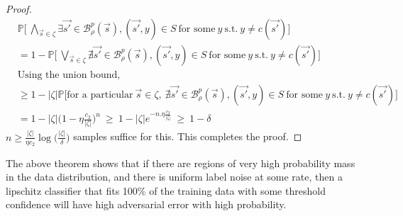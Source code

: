 \documentclass[12pt, oneside]{book}
\begin{document}
\begin{proof}
\begin{equation*}
    \label{eq:lipschitz-extension}
\begin{split}
    & \mathbb{P} \biggl [~\underset{\vec{s} \in \zeta}{\bigwedge} \exists 
    \vec{s'} \in \mathcal{B}_\rho^p(\vec{s}), 
    (\vec{s'}, y) \in S~\text{for some}~ y~\text{s.t.}~y \neq c(\vec{s'})
    \biggr] \\
    & = 1 - \mathbb{P} \biggl [~\underset{\vec{s} \in \zeta}{\bigvee} \nexists 
    \vec{s'} \in \mathcal{B}_\rho^p(\vec{s}), 
    (\vec{s'}, y) \in S~\text{for some}~ y~\text{s.t.}~y \neq c(\vec{s'})
    \biggr] \\
    & \text{Using the union bound,} \\
    & \geq 1 - |\zeta| \mathbb{P} \biggl [\text{for a particular}~\vec{s} \in \zeta,
    ~\nexists \vec{s'} \in \mathcal{B}_\rho^p(\vec{s}), 
    (\vec{s'}, y) \in S~\text{for some}~ y~\text{s.t.}~y \neq c(\vec{s'})
    \biggr] \\
    & = 1 - |\zeta| \biggl(1 - \eta \frac{c_2}{|\zeta|}\biggr)^{n}~
    \geq ~ 1 - |\zeta| e^{-n.\eta \frac{c_2}{|\zeta|}} ~ \geq ~ 1 - \delta
\end{split}
\end{equation*}
$n \geq \frac{|\zeta|}{\eta c_2} \log \bigl(\frac{|\zeta|}{\delta} \bigr)$
samples suffice for this. This completes the proof.
\end{proof}

The above theorem shows that if there are regions of very high probability mass
in the data distribution, and there is uniform label noise at some rate, then a
lipschitz classifier that fits 100\% of the training data with some threshold
confidence will have high adversarial error with high probability.
\end{document}
